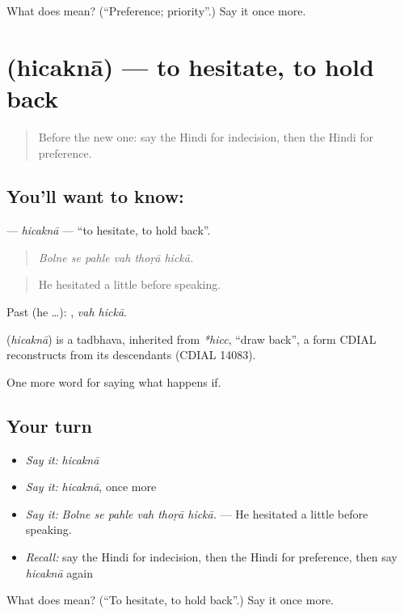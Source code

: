 \begin{tcolorbox}[breakable,colback=teal!4,colframe=teal!35!black,title={Before you move on}]
What does  mean? (\textquotedblleft{}Preference; priority\textquotedblright{}.) Say it once more.
\end{tcolorbox}
\section[\texorpdfstring{\hi{हिचकना} (hicaknā)}{हिचकना (hicaknā)}]{ (hicaknā) — to hesitate, to hold back}

\label{lesson:HI-C549-hicakna}



\begin{quote}
Before the new one: say the Hindi for indecision, then the Hindi for preference.
\end{quote}

\subsection*{You'll want to know: }
\textbf{} — \emph{hicaknā} — \textquotedblleft{}to hesitate, to hold back\textquotedblright{}.

\begin{quote}
     
\end{quote}

\begin{quote}
\emph{Bolne se pahle vah thoṛā hickā.}
\end{quote}

\begin{quote}
He hesitated a little before speaking.
\end{quote}

Past (he …):  , \emph{vah hickā}.

\begin{cousinweb}
\textbf{} (\emph{hicaknā}) is a tadbhava, inherited from \emph{*hicc}, \textquotedblleft{}draw back\textquotedblright{}, a form CDIAL reconstructs from its descendants (CDIAL 14083).
\end{cousinweb}

\begin{grammarlens}[title={What you've built}]
One more word for saying what happens if.
\end{grammarlens}

\subsection*{Your turn}
\begin{itemize}
\raggedright
  \item \emph{Say it:} \emph{hicaknā}
  \item \emph{Say it:} \emph{hicaknā}, once more
  \item \emph{Say it:} \emph{Bolne se pahle vah thoṛā hickā.} — He hesitated a little before speaking.
  \item \emph{Recall:} say the Hindi for indecision, then the Hindi for preference, then say \emph{hicaknā} again
\end{itemize}

\begin{tcolorbox}[breakable,colback=teal!4,colframe=teal!35!black,title={Before you move on}]
What does  mean? (\textquotedblleft{}To hesitate, to hold back\textquotedblright{}.) Say it once more.
\end{tcolorbox}
